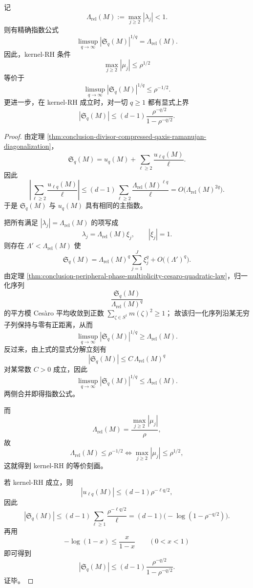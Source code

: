 \begin{theorem}\label{thm:conclusion-divisor-compressed-qaxis-squareroot-threshold}
记
\[
\Lambda_{\mathrm{rel}}(M):=\max_{j\ge 2}|\lambda_j|<1.
\]
则有精确指数公式
\[
\limsup_{q\to\infty}|\mathfrak S_q(M)|^{1/q}
=
\Lambda_{\mathrm{rel}}(M).
\]
因此，kernel-RH 条件
\[
\max_{j\ge 2}|\mu_j|\le \rho^{1/2}
\]
等价于
\[
\limsup_{q\to\infty}|\mathfrak S_q(M)|^{1/q}\le \rho^{-1/2}.
\]
更进一步，在 kernel-RH 成立时，对一切 \(q\ge 1\) 都有显式上界
\[
|\mathfrak S_q(M)|
\le
(d-1)\frac{\rho^{-q/2}}{1-\rho^{-q/2}}.
\]
\end{theorem}
\begin{proof}
由定理 \ref{thm:conclusion-divisor-compressed-qaxis-ramanujan-diagonalization}，
\[
\mathfrak S_q(M)=u_q(M)+\sum_{\ell\ge 2}\frac{u_{\ell q}(M)}{\ell}.
\]
因此
\[
\left|\sum_{\ell\ge 2}\frac{u_{\ell q}(M)}{\ell}\right|
\le
(d-1)\sum_{\ell\ge 2}\frac{\Lambda_{\mathrm{rel}}(M)^{\ell q}}{\ell}
=O\bigl(\Lambda_{\mathrm{rel}}(M)^{2q}\bigr).
\]
于是 \(\mathfrak S_q(M)\) 与 \(u_q(M)\) 具有相同的主指数。

把所有满足 \(|\lambda_j|=\Lambda_{\mathrm{rel}}(M)\) 的项写成
\[
\lambda_j=\Lambda_{\mathrm{rel}}(M)\xi_j,\qquad |\xi_j|=1.
\]
则存在 \(\Lambda'<\Lambda_{\mathrm{rel}}(M)\) 使
\[
\mathfrak S_q(M)
=
\Lambda_{\mathrm{rel}}(M)^q\sum_{j=1}^{J}\xi_j^q
+O\bigl((\Lambda')^q\bigr).
\]
由定理 \ref{thm:conclusion-peripheral-phase-multiplicity-cesaro-quadratic-law}，归一化序列
\[
\frac{\mathfrak S_q(M)}{\Lambda_{\mathrm{rel}}(M)^q}
\]
的平方模 Ces\`aro 平均收敛到正数
\(
\sum_{\zeta\in S^1}m(\zeta)^2\ge 1
\)；
故该归一化序列沿某无穷子列保持与零有正距离，从而
\[
\limsup_{q\to\infty}|\mathfrak S_q(M)|^{1/q}
\ge \Lambda_{\mathrm{rel}}(M).
\]
反过来，由上式的显式分解立刻有
\[
|\mathfrak S_q(M)|\le C\,\Lambda_{\mathrm{rel}}(M)^q
\]
对某常数 \(C>0\) 成立，因此
\[
\limsup_{q\to\infty}|\mathfrak S_q(M)|^{1/q}
\le \Lambda_{\mathrm{rel}}(M).
\]
两侧合并即得指数公式。

而
\[
\Lambda_{\mathrm{rel}}(M)=\frac{\max_{j\ge 2}|\mu_j|}{\rho},
\]
故
\[
\Lambda_{\mathrm{rel}}(M)\le \rho^{-1/2}
\iff
\max_{j\ge 2}|\mu_j|\le \rho^{1/2},
\]
这就得到 kernel-RH 的等价刻画。

若 kernel-RH 成立，则
\[
|u_{\ell q}(M)|\le (d-1)\rho^{-\ell q/2},
\]
因此
\[
|\mathfrak S_q(M)|
\le
(d-1)\sum_{\ell\ge 1}\frac{\rho^{-\ell q/2}}{\ell}
=(d-1)\bigl(-\log(1-\rho^{-q/2})\bigr).
\]
再用
\[
-\log(1-x)\le \frac{x}{1-x}\qquad (0<x<1)
\]
即可得到
\[
|\mathfrak S_q(M)|
\le
(d-1)\frac{\rho^{-q/2}}{1-\rho^{-q/2}}.
\]
证毕。
\end{proof}

